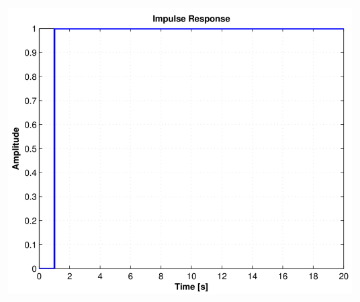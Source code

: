 \documentclass[twoside]{article}
\begin{document}
\begin{figure}[htbp]
\begin{subfigure}{0.25\textwidth}
	\includegraphics[width=\linewidth]{zadani11-c}
	\caption{}
  \label{fig:charakteristiky:c}
\end{subfigure}


\end{figure}
\end{document}
